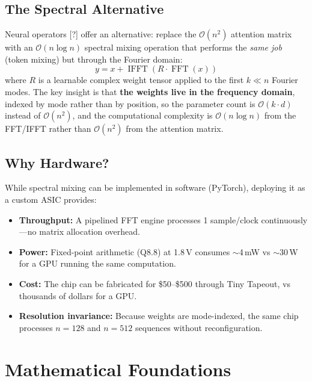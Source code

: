 \documentclass[11pt,a4paper]{article}
\theoremstyle{definition}
\theoremstyle{remark}
\newcommand{\FFT}{\operatorname{FFT}}
\newcommand{\IFFT}{\operatorname{IFFT}}
\newcommand{\bigO}{\mathcal{O}}
\begin{document}
\subsection{The Spectral Alternative}

Neural operators [?] offer an
alternative: replace the $\bigO(n^2)$ attention matrix with an $\bigO(n \log n)$
spectral mixing operation that performs the \emph{same job} (token mixing) but
through the Fourier domain:
\begin{equation}
  y = x + \IFFT\!\left( R \cdot \FFT(x) \right)
  \label{eq:spectral_mixing}
\end{equation}
where $R$ is a learnable complex weight tensor applied to the first $k \ll n$ Fourier
modes. The key insight is that \textbf{the weights live in the frequency domain},
indexed by mode rather than by position, so the parameter count is $\bigO(k \cdot d)$
instead of $\bigO(n^2)$, and the computational complexity is $\bigO(n \log n)$ from
the FFT/IFFT rather than $\bigO(n^2)$ from the attention matrix.

\subsection{Why Hardware?}

While spectral mixing can be implemented in software (PyTorch), deploying it as a
custom ASIC provides:
\begin{itemize}[noitemsep]
  \item \textbf{Throughput:} A pipelined FFT engine processes 1 sample/clock
    continuously---no matrix allocation overhead.
  \item \textbf{Power:} Fixed-point arithmetic (Q8.8) at 1.8\,V consumes
    $\sim$4\,mW vs $\sim$30\,W for a GPU running the same computation.
  \item \textbf{Cost:} The chip can be fabricated for \$50--\$500 through Tiny
    Tapeout, vs thousands of dollars for a GPU.
  \item \textbf{Resolution invariance:} Because weights are mode-indexed, the
    same chip processes $n=128$ and $n=512$ sequences without reconfiguration.
\end{itemize}

\section{Mathematical Foundations}
\end{document}
